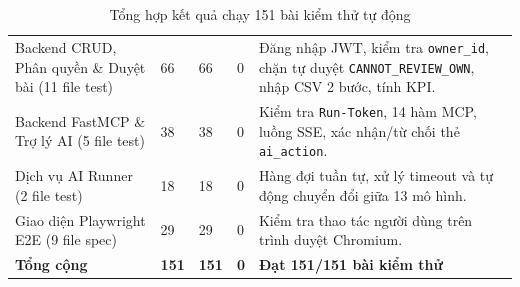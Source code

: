 \begin{table}[!htbp]
\centering
\footnotesize
\renewcommand{\arraystretch}{1.02}
\caption{Tổng hợp kết quả chạy 151 bài kiểm thử tự động}
\label{tab:test-breakdown}
\begin{tabularx}{\textwidth}{|L{4.8cm}|C{1.3cm}|C{1.3cm}|C{1.3cm}|Y|}
\hline
{} &  &  &  & \\
\hline
Backend CRUD, Phân quyền \& Duyệt bài (11 file test) & 66 & 66 & 0 & Đăng nhập JWT, kiểm tra \texttt{owner\_id}, chặn tự duyệt \texttt{CANNOT\_REVIEW\_OWN}, nhập CSV 2 bước, tính KPI.\\
\hline
Backend FastMCP \& Trợ lý AI (5 file test) & 38 & 38 & 0 & Kiểm tra \texttt{Run-Token}, 14 hàm MCP, luồng SSE, xác nhận/từ chối thẻ \texttt{ai\_action}.\\
\hline
Dịch vụ AI Runner (2 file test) & 18 & 18 & 0 & Hàng đợi tuần tự, xử lý timeout và tự động chuyển đổi giữa 13 mô hình.\\
\hline
Giao diện Playwright E2E (9 file spec) & 29 & 29 & 0 & Kiểm tra thao tác người dùng trên trình duyệt Chromium.\\
\hline
\textbf{Tổng cộng} & \textbf{151} & \textbf{151} & \textbf{0} & \textbf{Đạt 151/151 bài kiểm thử}\\
\hline
\end{tabularx}
\end{table}


